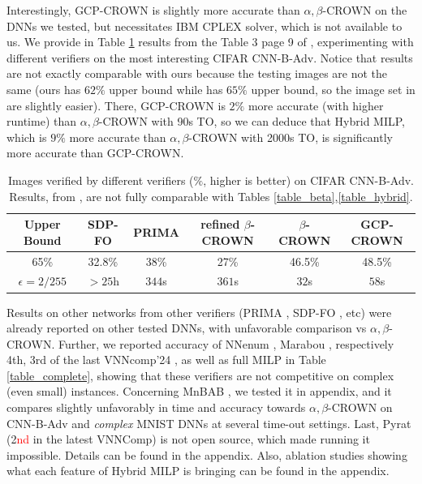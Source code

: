 Interestingly, GCP-CROWN \cite{cutting} is slightly more accurate than $\alpha,\beta$-CROWN on the DNNs we tested, but necessitates IBM CPLEX solver, which is not available to us.
We provide in Table \ref{table_gcp} results from the Table 3 page 9 of \cite{cutting}, experimenting with different verifiers on the most interesting CIFAR CNN-B-Adv. Notice that results are not exactly comparable with ours because the testing images are not the same (ours has $62\%$ upper bound while \cite{cutting} has $65\%$ upper bound, so the image set in \cite{cutting} are slightly easier). There, GCP-CROWN is $2\%$ more accurate (with higher runtime) than $\alpha,\beta$-CROWN with 90s TO, so we can deduce that Hybrid MILP, which is $9\%$ more accurate than $\alpha,\beta$-CROWN with 2000s TO, is significantly more accurate than GCP-CROWN.




\begin{table}[t!]
	\centering
		\caption{Images verified by different verifiers ($\%$, higher is better) on CIFAR CNN-B-Adv. Results, from \cite{cutting}, are not fully comparable with Tables \ref{table_beta},\ref{table_hybrid}.}
	\label{table_gcp}
	\begin{tabular}{||c||c|c|c|c|c||}
		\hline
		Upper Bound & SDP-FO & PRIMA & refined $\beta$-CROWN & $\beta$-CROWN & GCP-CROWN \\  \hline
		65\% & 32.8\% & 38\% & 27\% & 46.5\% & 48.5\% \\
		$\epsilon = 2/255$ & $>25$h & $344$s & $361$s & $32$s &  $58$s  \\  \hline
	\end{tabular}
\end{table}


Results on other networks from other verifiers (PRIMA \cite{prima}, SDP-FO \cite{SDPFI}, etc) were already reported \cite{crown} on other tested DNNs, with unfavorable comparison vs $\alpha,\beta$-CROWN. Further, we reported accuracy of NNenum \cite{nnenum}, Marabou \cite{Marabou,Marabou2}, respectively 4th, 3rd of the last VNNcomp'24 \cite{VNNcomp24}, as well as full MILP \cite{MILP} in Table \ref{table_complete}, showing that these verifiers are not competitive on complex (even small) instances. Concerning MnBAB \cite{ferrari2022complete}, we tested it in appendix, and it compares slightly unfavorably in time and accuracy towards $\alpha,\beta$-CROWN on CNN-B-Adv and {\em complex} MNIST DNNs at several time-out settings. Last, Pyrat \cite{pyrat} (2\textcolor{red}{nd} in the latest VNNComp) is not open source, which made running it impossible. Details can be found in the appendix. Also, ablation studies showing what each feature of Hybrid MILP is bringing can be found in the appendix.



